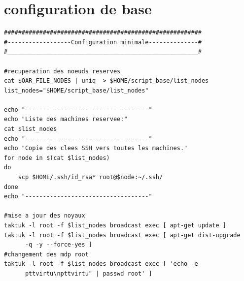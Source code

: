 \documentclass[a4paper,11pt]{report}
\begin{document}
      \section{configuration de base}
      \begin{lstlisting}
########################################################
#------------------Configuration minimale--------------#
#______________________________________________________#

#recuperation des noeuds reserves
cat $OAR_FILE_NODES | uniq  > $HOME/script_base/list_nodes
list_nodes="$HOME/script_base/list_nodes"

echo "-----------------------------------"
echo "Liste des machines reservee:"
cat $list_nodes
echo "-----------------------------------"
echo "Copie des clees SSH vers toutes les machines."
for node in $(cat $list_nodes)
do
	scp $HOME/.ssh/id_rsa* root@$node:~/.ssh/
done
echo "-----------------------------------"

#mise a jour des noyaux
taktuk -l root -f $list_nodes broadcast exec [ apt-get update ]
taktuk -l root -f $list_nodes broadcast exec [ apt-get dist-upgrade 
      -q -y --force-yes ]
#changement des mdp root
taktuk -l root -f $list_nodes broadcast exec [ 'echo -e 
      pttvirtu\npttvirtu" | passwd root' ]
      \end{lstlisting}

      \newpage
\end{document}
